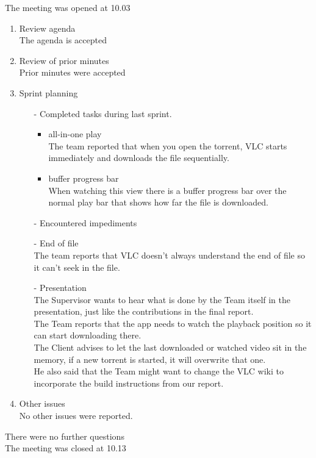 \documentclass[pdftex, 12pt, a4paper]{report}
\begin{document}
\pagestyle{fancy}

The meeting was opened at 10.03\\

\begin{enumerate}
\item Review agenda\\
The agenda is accepted
\item Review of prior minutes\\
Prior minutes were accepted
\item Sprint planning\\
\begin{enumerate}
\item[-] Completed tasks during last sprint.\\
	\begin{itemize}
	\item all-in-one play\\
	The team reported that when you open the torrent, VLC starts immediately and downloads the file sequentially.
	\item buffer progress bar\\
	When watching this view there is a buffer progress bar over the normal play bar that shows how far the file is downloaded.
	\end{itemize}
\item[-] Encountered impediments\\
\item[-] End of file\\
The team reports that VLC doesn't always understand the end of file so it can't seek in the file.
\item[-] Presentation\\
The Supervisor wants to hear what is done by the Team itself in the presentation, just like the contributions in the final report.\\
The Team reports that the app needs to watch the playback position so it can start downloading there.\\
The Client advises to let the last downloaded or watched video sit in the memory, if a new torrent is started, it will overwrite that one.\\
He also said that the Team might want to change the VLC wiki to incorporate the build instructions from our report.
\end{enumerate}
\item Other issues\\
No other issues were reported.\\
\end{enumerate}

There were no further questions\\

The meeting was closed at 10.13\\
\end{document}
